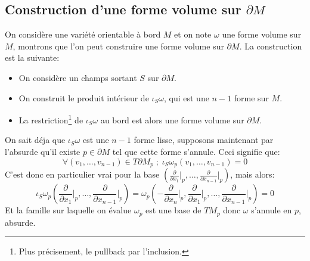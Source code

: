    \subsection*{Construction d'une forme volume sur $\partial M$}
      On considère une variété orientable à bord $M$ et on note $\omega$ une forme volume sur $M$, montrons que l'on peut construire une forme volume sur $\partial M$. La construction est la suivante:
      \begin{itemize}
         \item On considère un champs sortant $S$ sur $\partial M$.
         \item On construit le produit intérieur de $\iota_S\omega$, qui est une $n-1$ forme sur $M$.
         \item La restriction\footnote{Plus précisement, le pullback par l'inclusion.}  de $\iota_S\omega$ au bord est alors une forme volume sur $\partial M$.
      \end{itemize}
      On sait déja que $\iota_S\omega$ est une $n-1$ forme lisse, supposons maintenant par l'absurde qu'il existe $p \in \partial M$ tel que cette forme s’annule. Ceci signifie que:
      $$
         \forall (v_1, \ldots, v_{n-1}) \in T\partial M_p \; ; \; \iota_S\omega_p(v_1, \ldots, v_{n-1}) = 0
      $$
      C'est donc en particulier vrai pour la base $\left(\frac{\partial}{\partial x_1}\big|_p, \ldots, \frac{\partial}{\partial x_{n-1}}\big|_p\right)$, mais alors:
      $$
      \iota_S\omega_p\left(\frac{\partial}{\partial x_1}\bigg|_p, \ldots, \frac{\partial}{\partial x_{n-1}}\bigg|_p\right) = \omega_p\left(-\frac{\partial}{\partial x_n}\bigg|_p,\frac{\partial}{\partial x_1}\bigg|_p, \ldots, \frac{\partial}{\partial x_{n-1}}\bigg|_p\right) = 0
      $$
      Et la famille sur laquelle on évalue $\omega_p$ est une base de $TM_p$ donc $\omega$ s'annule en \( p \), absurde.

